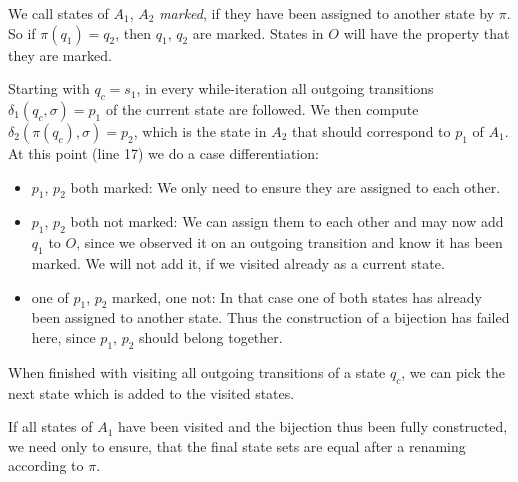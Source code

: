 We call states of $A_1$, $A_2$ \emph{marked}, if they have been assigned to another state by $\pi$. So if $\pi(q_1)=q_2$, then $q_1$, $q_2$ are marked. States in $O$ will have the property that they are marked.

Starting with $q_c = s_1$, in every while-iteration all outgoing transitions $\delta_1(q_c, \sigma) = p_1$ of the current state are followed. We then compute $\delta_2(\pi(q_c), \sigma) = p_2$, which is the state in $A_2$ that should correspond to $p_1$ of $A_1$. At this point (line 17) we do a case differentiation:
\begin{itemize}
	\item $p_1$, $p_2$ both marked: We only need to ensure they are assigned to each other.
	\item $p_1$, $p_2$ both not marked: We can assign them to each other and may now add $q_1$ to $O$, since we observed it on an outgoing transition and know it has been marked. We will not add it, if we visited already as a current state.
	\item one of $p_1$, $p_2$ marked, one not: In that case one of both states has already been assigned to another state. Thus the construction of a bijection has failed here, since $p_1$, $p_2$ should belong together.
\end{itemize}
When finished with visiting all outgoing transitions of a state $q_c$, we can pick the next state which is added to the visited states.

If all states of $A_1$ have been visited and the bijection thus been fully constructed, we need only to ensure, that the final state sets are equal after a renaming according to $\pi$.